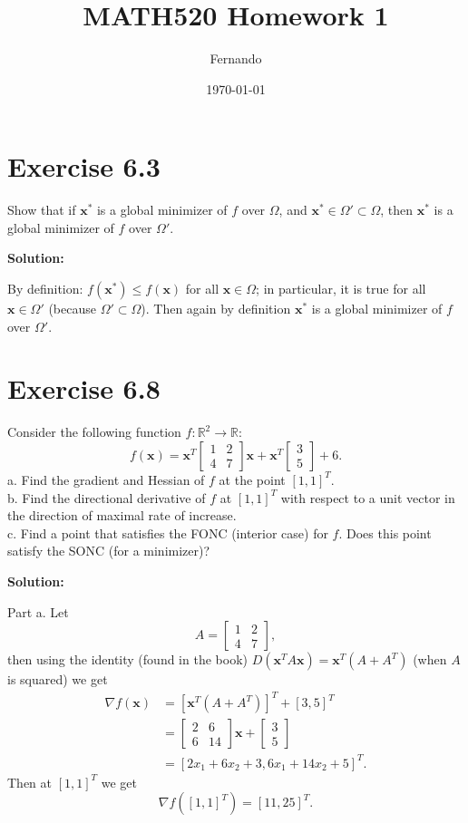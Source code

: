 \documentclass{article}
\newcommand{\bld}[1]{\boldsymbol{#1}}
\begin{document}
\title{MATH520 Homework 1}
\author{Fernando}
\date{\today}
\maketitle

\section*{Exercise 6.3}
Show that if $\bld{x}^*$ is a global minimizer of $f$ over $\Omega$, and
$\bld{x}^*\in\Omega'\subset \Omega$, then $\bld{x}^*$ is a global minimizer of $f$ over
$\Omega'$.

\textbf{Solution:}

By definition: $f(\bld{x}^*)\leq f(\bld{x})$ for all $\bld{x}\in \Omega$; in
particular, it is true for all $\bld{x}\in\Omega'$ (because $\Omega'\subset
\Omega$). Then again by definition $\bld{x}^*$ is a global minimizer of $f$
over $\Omega'$.
\section*{Exercise 6.8}
Consider the following function $f:\mathbb{R}^2 \to \mathbb{R}$:
\[
	f(\bld{x})=\bld{x}^T
	\begin{bmatrix}
	1 & 2\\
	4 & 7
	\end{bmatrix}
	\bld{x} + \bld{x}^T
	\begin{bmatrix}
	3\\
	5
	\end{bmatrix}
	+ 6.
\]
a. Find the gradient and Hessian of $f$ at the point $[1,1]^T$.\\
b. Find the directional derivative of $f$ at $[1,1]^T$ with respect to a unit
vector in the direction of maximal rate of increase.\\
c. Find a point that satisfies the FONC (interior case) for $f$. Does this
point satisfy the SONC (for a minimizer)?

\textbf{Solution:}

Part a. Let
\[
	A = \begin{bmatrix}
		1 & 2\\
		4 & 7
	\end{bmatrix},
\]
then using the identity (found in the book)
$D(\bld{x}^TA\bld{x})=\bld{x}^T(A+A^T)$ (when $A$ is squared) we get
\begin{align*}
\nabla f(\bld{x}) &= \left[\bld{x}^T(A+A^T)\right]^T + [3,5]^T\\
&= \begin{bmatrix}
	2 & 6\\
	6 & 14
\end{bmatrix}\bld{x} + \begin{bmatrix}
3\\
5
\end{bmatrix}\\
&=[2x_1+6x_2+3,6x_1+14x_2+5]^T.
\end{align*}
Then at $[1,1]^T$ we get
\[
\nabla f([1,1]^T)=[11,25]^T.
\]
\end{document}
